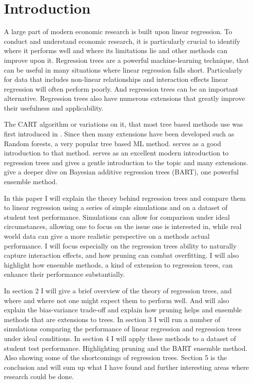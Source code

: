 \documentclass[12pt]{article}
\begin{document}



\tableofcontents


\section{Introduction}

A large part of modern economic research is built upon linear regression. To conduct and understand economic research, it is particularly crucial to identify where it performs well and where its limitations lie and other methods can improve upon it. Regression trees are a powerful machine-learning technique, that can be useful in many situations where linear regression falls short. Particularly for data that includes non-linear relationships and interaction effects linear regression will often perform poorly. And regression trees can be an important alternative. Regression trees also have numerous extensions that greatly improve their usefulness and applicability.

The CART algorithm or variations on it, that most tree based methods use was first introduced in \citep{breiman1984}. Since then many extensions have been developed such as Random forests, a very popular tree based ML method. \citep{biau2016} serves as a good introduction to that method. \citep{hastie2021} serves as an excellent modern introduction to regression trees and gives a gentle introduction to the topic and many extensions. \citep{tan2019} give a deeper dive on Bayesian additive regression trees (BART), one powerful ensemble method.

In this paper I will explain the theory behind regression trees and compare them to linear regression using a series of simple simulations and on a dataset of student test performance. Simulations can allow for comparison under ideal circumstances, allowing one to focus on the issue one is interested in, while real world data can give a more realistic perspective on a methods actual performance. I will focus especially on the regression trees ability to naturally capture interaction effects, and how pruning can combat overfitting. I will also highlight how ensemble methods, a kind of extension to regression trees, can enhance their performance substantially.

In section 2 I will give a brief overview of the theory of regression trees, and where and where not one might expect them to perform well. And will also explain the bias-variance trade-off and explain how pruning helps and ensemble methods that are extensions to trees. In section 3 I will run a number of simulations comparing the performance of linear regression and regression trees under ideal conditions. In section 4 I will apply these methods to a dataset of student test performance. Highlighting pruning and the BART ensemble method. Also showing some of the shortcomings of regression trees. Section 5 is the conclusion and will sum up what I have found and further interesting areas where research could be done.
\end{document}
